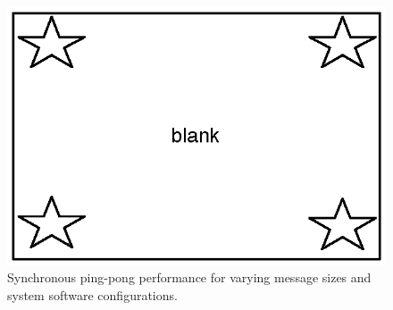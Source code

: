 \begin{figure}
\begin{centering}
\includegraphics{figs/blank.eps}
\caption{Synchronous ping-pong performance for varying message sizes and system software configurations.}
\label{fig:pingpong}
\end{centering}
\end{figure}

